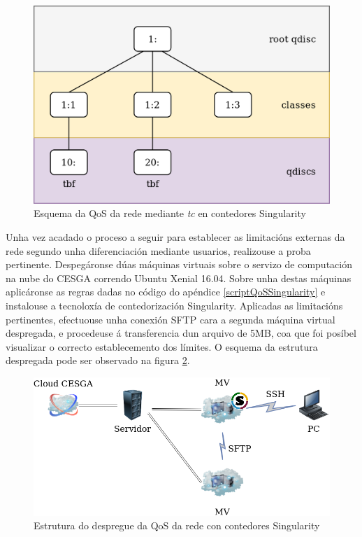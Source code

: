 \begin{figure}
\centerline{\includegraphics[width=15cm]{figuras/qdiscSingularity.png}}
\caption{Esquema da QoS da rede mediante {\it tc} en contedores Singularity}
\label{qdiscSingularity}
\end{figure}

Unha vez acadado o proceso a seguir para establecer as limitacións externas da rede segundo unha diferenciación mediante usuarios, realizouse a proba pertinente. Despegáronse dúas máquinas virtuais sobre o servizo de computación na nube do \gls{CESGA} correndo Ubuntu Xenial 16.04. Sobre unha destas máquinas aplicáronse as regras dadas no código do apéndice \ref{scriptQoSSingularity} e instalouse a tecnoloxía de contedorización Singularity. Aplicadas as limitacións pertinentes, efectuouse unha conexión \gls{SFTP} cara a segunda máquina virtual despregada, e procedeuse á transferencia dun arquivo de 5MB, coa que foi posíbel visualizar o correcto establecemento dos límites. O esquema da estrutura despregada pode ser observado na figura \ref{DiagramaQoSRedeSingularity}.\\

\begin{figure}
\centerline{\includegraphics[width=15cm]{figuras/DiagramaQoSRedeSingularity.png}}
\caption{Estrutura do despregue da QoS da rede con contedores Singularity}
\label{DiagramaQoSRedeSingularity}
\end{figure}

